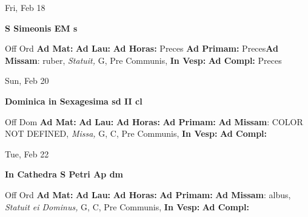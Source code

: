 \documentclass[10pt]{memoir}
\begin{document}
\begin{center}
\begin{minipage}{3.5in}
\vspace{2em}
\begin{center}Fri, Feb 18
\end{center}
\textbf{ \large S Simeonis EM
\textnormal{\normalsize s}}

\begin{justify}Off Ord
\textbf{Ad Mat: }
\textbf{Ad Lau: }
\textbf{Ad Horas: }Preces
\textbf{Ad Primam: }Preces\textbf{Ad Missam}: ruber, \textit{Statuit,} G, Pre Communis, 
\textbf{In Vesp: }
\textbf{Ad Compl: }Preces
\end{justify}
\end{minipage}
\end{center}

\begin{center}
\begin{minipage}{3.5in}
\vspace{2em}
\begin{center}Sun, Feb 20
\end{center}
\textbf{ \large Dominica in Sexagesima
\textnormal{\normalsize sd II cl}}

\begin{justify}Off Dom
\textbf{Ad Mat: }
\textbf{Ad Lau: }
\textbf{Ad Horas: }
\textbf{Ad Primam: }\textbf{Ad Missam}: COLOR NOT DEFINED, \textit{Missa,} G, C, Pre Communis, 
\textbf{In Vesp: }
\textbf{Ad Compl: }
\end{justify}
\end{minipage}
\end{center}

\begin{center}
\begin{minipage}{3.5in}
\vspace{2em}
\begin{center}Tue, Feb 22
\end{center}
\textbf{ \large In Cathedra S Petri Ap
\textnormal{\normalsize dm}}

\begin{justify}Off Ord
\textbf{Ad Mat: }
\textbf{Ad Lau: }
\textbf{Ad Horas: }
\textbf{Ad Primam: }\textbf{Ad Missam}: albus, \textit{Statuit ei Dominus,} G, C, Pre Communis, 
\textbf{In Vesp: }
\textbf{Ad Compl: }
\end{justify}
\end{minipage}
\end{center}
\end{document}
